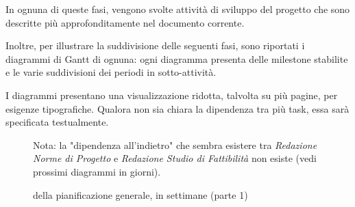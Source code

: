 In ognuna di queste fasi, vengono svolte attività di sviluppo del progetto che sono descritte più approfonditamente nel documento corrente.

Inoltre, per illustrare la suddivisione delle seguenti fasi, sono riportati i diagrammi di Gantt di ognuna: ogni diagramma presenta delle milestone stabilite e le varie suddivisioni dei periodi in sotto-attività.

I diagrammi presentano una visualizzazione ridotta, talvolta su più pagine, per esigenze tipografiche. Qualora non sia chiara la dipendenza tra più task, essa sarà specificata testualmente.

\begin{figure}[H]
\label{tab:genweeks}
\caption{ della pianificazione generale, in settimane (parte 1)}

Nota: la "dipendenza all'indietro" che sembra esistere tra \emph{Redazione Norme di Progetto} e \emph{Redazione Studio di Fattibilità} non esiste (vedi prossimi diagrammi in giorni).
\end{figure}


